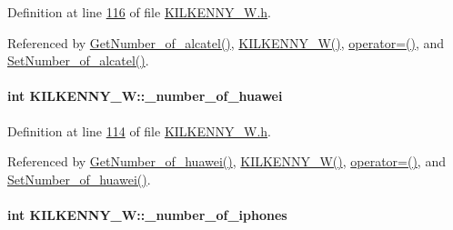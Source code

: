 Definition at line \hyperlink{_k_i_l_k_e_n_n_y___w_8h_source_l00116}{116} of file \hyperlink{_k_i_l_k_e_n_n_y___w_8h_source}{K\+I\+L\+K\+E\+N\+N\+Y\+\_\+\+W.\+h}.



Referenced by \hyperlink{_k_i_l_k_e_n_n_y___w_8cpp_source_l00073}{Get\+Number\+\_\+of\+\_\+alcatel()}, \hyperlink{_k_i_l_k_e_n_n_y___w_8h_source_l00024}{K\+I\+L\+K\+E\+N\+N\+Y\+\_\+\+W()}, \hyperlink{_k_i_l_k_e_n_n_y___w_8h_source_l00075}{operator=()}, and \hyperlink{_k_i_l_k_e_n_n_y___w_8cpp_source_l00069}{Set\+Number\+\_\+of\+\_\+alcatel()}.

\paragraph[{\texorpdfstring{\+\_\+number\+\_\+of\+\_\+huawei}{_number_of_huawei}}]{\setlength{\rightskip}{0pt plus 5cm}int K\+I\+L\+K\+E\+N\+N\+Y\+\_\+\+W\+::\+\_\+number\+\_\+of\+\_\+huawei\hspace{0.3cm}{\ttfamily [private]}}\hypertarget{class_k_i_l_k_e_n_n_y___w_a5aedbf8c3815df0d35a94ed9105f6574_a5aedbf8c3815df0d35a94ed9105f6574}{}\label{class_k_i_l_k_e_n_n_y___w_a5aedbf8c3815df0d35a94ed9105f6574_a5aedbf8c3815df0d35a94ed9105f6574}


Definition at line \hyperlink{_k_i_l_k_e_n_n_y___w_8h_source_l00114}{114} of file \hyperlink{_k_i_l_k_e_n_n_y___w_8h_source}{K\+I\+L\+K\+E\+N\+N\+Y\+\_\+\+W.\+h}.



Referenced by \hyperlink{_k_i_l_k_e_n_n_y___w_8cpp_source_l00089}{Get\+Number\+\_\+of\+\_\+huawei()}, \hyperlink{_k_i_l_k_e_n_n_y___w_8h_source_l00024}{K\+I\+L\+K\+E\+N\+N\+Y\+\_\+\+W()}, \hyperlink{_k_i_l_k_e_n_n_y___w_8h_source_l00075}{operator=()}, and \hyperlink{_k_i_l_k_e_n_n_y___w_8cpp_source_l00085}{Set\+Number\+\_\+of\+\_\+huawei()}.

\paragraph[{\texorpdfstring{\+\_\+number\+\_\+of\+\_\+iphones}{_number_of_iphones}}]{\setlength{\rightskip}{0pt plus 5cm}int K\+I\+L\+K\+E\+N\+N\+Y\+\_\+\+W\+::\+\_\+number\+\_\+of\+\_\+iphones\hspace{0.3cm}{\ttfamily [private]}}\hypertarget{class_k_i_l_k_e_n_n_y___w_a91935316f3da1d18589f7d02ec0ac24c_a91935316f3da1d18589f7d02ec0ac24c}{}\label{class_k_i_l_k_e_n_n_y___w_a91935316f3da1d18589f7d02ec0ac24c_a91935316f3da1d18589f7d02ec0ac24c}


